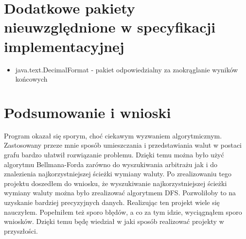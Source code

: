 \documentclass[12pt]{article}
\begin{document}
\section{Dodatkowe pakiety nieuwzględnione w specyfikacji implementacyjnej}
\begin{itemize}
\item java.text.DecimalFormat - pakiet odpowiedzialny za zaokrąglanie wyników końcowych
\end{itemize}

\section{Podsumowanie i wnioski}
Program okazał się sporym, choć ciekawym wyzwaniem algorytmicznym. Zastosowany przeze mnie sposób umieszczania i przedstawiania walut w postaci grafu bardzo ułatwił rozwiązanie problemu. Dzięki temu można było użyć algorytmu Bellmana-Forda zarówno do wyszukiwania arbitrażu jak i do znalezienia najkorzystniejszej ścieżki wymiany waluty.
\newline\newline
Po zrealizowaniu tego projektu doszedłem do wniosku, że wyszukiwanie najkorzystniejszej ścieżki wymiany waluty można było zrealizować algorytmem DFS. Pozwoliłoby to na uzyskanie bardziej precyzyjnych danych.
\newline\newline
Realizując ten projekt wiele się nauczyłem. Popełniłem też sporo błędów, a co za tym idzie, wyciągnąłem sporo wniosków. Dzięki temu będę wiedział w jaki sposób realizować projekty w przyszłości.
\end{document}
